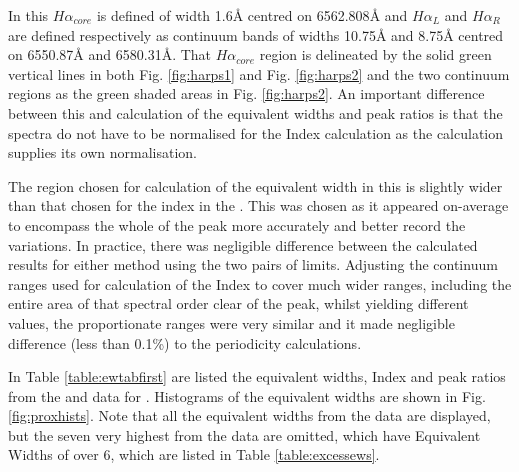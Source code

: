 In this $ H\alpha_{core} $ is defined  of width 1.6{\AA} centred on 6562.808{\AA} and $ H\alpha_L $ and
$H \alpha_R $ are defined respectively as continuum bands of widths 10.75{\AA} and 8.75{\AA} centred on 6550.87{\AA} and
6580.31\AA. That $ H\alpha_{core} $ region is delineated by the solid green vertical lines in both Fig. \ref{fig:harps1}
and Fig. \ref{fig:harps2} and the two continuum regions as the green shaded areas in Fig. \ref{fig:harps2}.
An important difference between this and calculation of the equivalent widths and peak ratios is that the
spectra do not have to be normalised for the {\ha} Index calculation as the calculation supplies its own normalisation.

The region chosen for calculation of the {\ha} equivalent width in this {\paperorthesis} is slightly wider than that
chosen for the {\ha} index in the \citet{suarezmascareno15}. This was chosen as it appeared on-average to encompass the
whole of the {\ha} peak more accurately and  better record the variations. In practice, there was
negligible difference between the calculated results for either method using the two pairs of limits. Adjusting the
continuum ranges used for calculation of the {\ha} Index to cover much wider ranges, including the entire area of that
spectral order clear of the {\ha} peak, whilst yielding different values, the proportionate ranges were very similar and
it made negligible difference (less than 0.1\%) to the periodicity calculations.

In Table \ref{table:ewtabfirst} are listed the equivalent widths, {\ha} Index and peak ratios from the {\uves} and
{\harps} data for {\prox}. Histograms of the equivalent widths are shown in Fig. \ref{fig:proxhists}. Note
that all the equivalent widths from the {\uves} data are displayed, but the seven very highest from the {\harps} data are
omitted, which have Equivalent Widths of over 6, which are listed in Table \ref{table:excessews}. 

